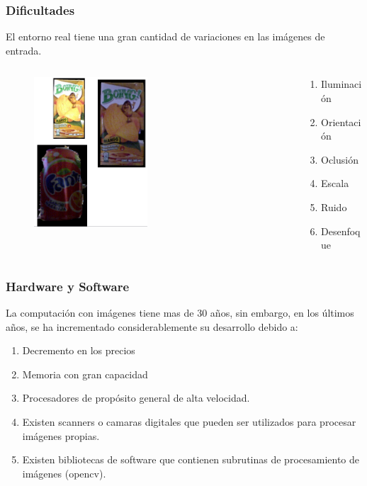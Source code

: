 \begin{frame}\frametitle{Dificultades}

  El entorno real tiene una gran cantidad de variaciones en las imágenes de entrada.
  \begin{columns}
    \begin{column}{0.5\textwidth}
\begin{figure} %
    \centering
    \includegraphics[width=0.5\textwidth]{Figures/VisionDificulties.png}
\end{figure}
    \end{column}
    \begin{column}{0.5\textwidth}
\begin{enumerate}
\item Iluminación
\item Orientación
\item Oclusión
\item Escala
\item Ruido
\item Desenfoque
\end{enumerate}
    \end{column}
  \end{columns}
\end{frame}

\begin{frame}\frametitle{Hardware y Software}
La computación con imágenes tiene mas de 30 años, sin embargo, en los últimos años, se ha incrementado considerablemente su desarrollo debido a:
\begin{enumerate}
\item Decremento en los precios 
\item Memoria con gran capacidad
\item Procesadores de propósito general de alta velocidad.
\item Existen scanners o camaras digitales que pueden ser utilizados para procesar imágenes propias.
\item Existen bibliotecas de software que contienen subrutinas de procesamiento de imágenes (opencv).
\end{enumerate}
\end{frame}



